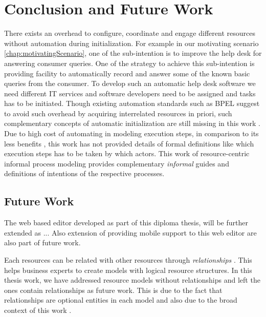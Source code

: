 \chapter{Conclusion and Future Work}
\label{chap:conclusion}

There exists an overhead to configure, coordinate and engage different resources without automation during initialization. For example in our motivating scenario \ref{chap:motivatingScenario}, one of the sub-intention is to improve the help desk for answering consumer queries. One of the strategy to achieve this sub-intention is providing facility to automatically record and answer some of the known basic queries from the consumer.  To develop such an automatic help desk software we need different IT services and software developers need to be assigned and tasks has to be initiated. Though existing automation standards such as BPEL suggest to avoid such overhead by acquiring interrelated resources in priori, such complementary concepts of automatic initialization are still missing in this work  \cite{Sungur2015}. Due to high cost of automating in modeling execution steps, in comparison to its less benefits \cite{Sungur2015}, this work has not provided details of  formal definitions like which execution steps has to be taken by which actors. This work of resource-centric informal process modeling provides complementary \textit{informal} guides and definitions of intentions of the respective processes. 



\section*{Future Work}
\label{sec:futurework}
The web based editor developed as part of this diploma thesis, will be further extended as ...
Also extension of providing mobile support to this web editor are also part of future work. 

Each resources can be related with other resources through \textit{relationships} . This helps business experts to create models with logical resource structures. In this thesis work, we have addressed resource models without relationships and left the ones contain relationships as future work. This is due to the fact that relationships are optional entities in each model and also due to the broad context of this work \cite{Sungur2014a}. 



